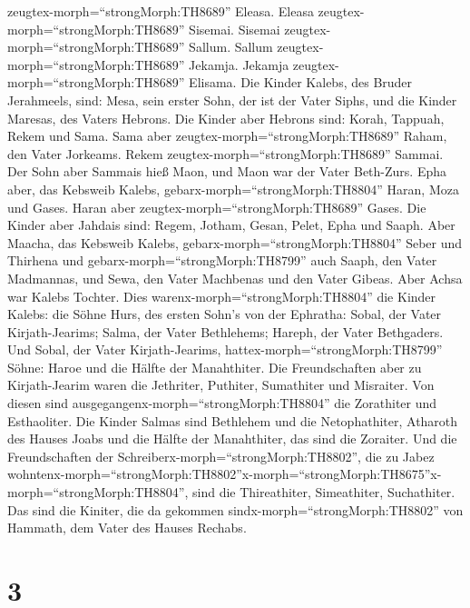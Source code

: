 zeugtex-morph=``strongMorph:TH8689'' Eleasa.  Eleasa
zeugtex-morph=``strongMorph:TH8689'' Sisemai. Sisemai
zeugtex-morph=``strongMorph:TH8689'' Sallum.  Sallum
zeugtex-morph=``strongMorph:TH8689'' Jekamja. Jekamja
zeugtex-morph=``strongMorph:TH8689'' Elisama.  Die Kinder
Kalebs, des Bruder Jerahmeels, sind: Mesa, sein erster Sohn, der ist der
Vater Siphs, und die Kinder Maresas, des Vaters Hebrons. 
Die Kinder aber Hebrons sind: Korah, Tappuah, Rekem und Sama.
 Sama aber zeugtex-morph=``strongMorph:TH8689'' Raham, den
Vater Jorkeams. Rekem zeugtex-morph=``strongMorph:TH8689'' Sammai.
 Der Sohn aber Sammais hieß Maon, und Maon war der Vater
Beth-Zurs.  Epha aber, das Kebsweib Kalebs,
gebarx-morph=``strongMorph:TH8804'' Haran, Moza und Gases. Haran aber
zeugtex-morph=``strongMorph:TH8689'' Gases.  Die Kinder
aber Jahdais sind: Regem, Jotham, Gesan, Pelet, Epha und Saaph.
 Aber Maacha, das Kebsweib Kalebs,
gebarx-morph=``strongMorph:TH8804'' Seber und Thirhena  und
gebarx-morph=``strongMorph:TH8799'' auch Saaph, den Vater Madmannas, und
Sewa, den Vater Machbenas und den Vater Gibeas. Aber Achsa war Kalebs
Tochter.  Dies warenx-morph=``strongMorph:TH8804'' die
Kinder Kalebs: die Söhne Hurs, des ersten Sohn's von der Ephratha:
Sobal, der Vater Kirjath-Jearims;  Salma, der Vater
Bethlehems; Hareph, der Vater Bethgaders.  Und Sobal, der
Vater Kirjath-Jearims, hattex-morph=``strongMorph:TH8799'' Söhne: Haroe
und die Hälfte der Manahthiter.  Die Freundschaften aber zu
Kirjath-Jearim waren die Jethriter, Puthiter, Sumathiter und Misraiter.
Von diesen sind ausgegangenx-morph=``strongMorph:TH8804'' die Zorathiter
und Esthaoliter.  Die Kinder Salmas sind Bethlehem und die
Netophathiter, Atharoth des Hauses Joabs und die Hälfte der Manahthiter,
das sind die Zoraiter.  Und die Freundschaften der
Schreiberx-morph=``strongMorph:TH8802'', die zu Jabez
wohntenx-morph=``strongMorph:TH8802''\textbar x-morph=``strongMorph:TH8675''x-morph=``strongMorph:TH8804'',
sind die Thireathiter, Simeathiter, Suchathiter. Das sind die Kiniter,
die da gekommen sindx-morph=``strongMorph:TH8802'' von Hammath, dem
Vater des Hauses Rechabs.

\hypertarget{section-2}{%
\section{3}\label{section-2}}

